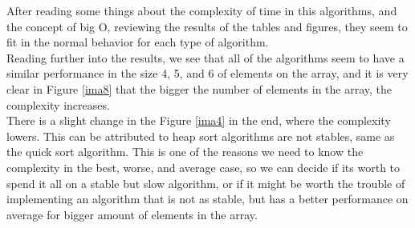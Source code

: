 \documentclass{article}
\begin{document}
After reading some things about the complexity of time in this algorithms, and the concept of big O, reviewing the results of the tables and figures, they seem to fit in the normal behavior for each type of algorithm. \\

Reading further into the results, we see that all of the algorithms seem to have a similar performance in the size 4, 5, and 6 of elements on the array, and it is very clear in Figure \ref{ima8} that the bigger the number of elements in the array, the complexity increases.\\

There is a slight change in the Figure \ref{ima4} in the end, where the complexity lowers. This can be attributed to heap sort algorithms are not stables, same as the quick sort algorithm. This is one of the reasons we need to know the complexity in the best, worse, and average case, so we can decide if its worth to spend it all on a stable but slow algorithm, or if it might be worth the trouble of implementing an algorithm that is not as stable, but has a better performance on average for bigger amount of elements in the array.\\

 
\end{document}
